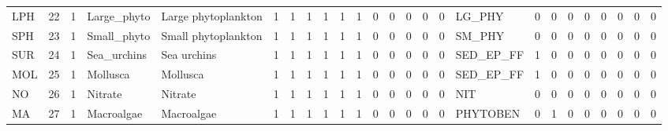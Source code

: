\documentclass[11pt]{article}
\begin{document}
\begin{table}[htb]
\begin{center}
\begin{tabular}{lrrllrrrrrrrrrrrlrrrrrrrr}
 LPH   &     22  &           1  &  Large_phyto           &  Large phytoplankton   &           1  &             1  &          1  &          1  &                1  &          1  &                0  &                  0  &         0  &           0  &      0  &  LG_PHY        &           0  &        0  &             0  &           0  &              0  &             0  &           0  &            0  \\
 SPH   &     23  &           1  &  Small_phyto           &  Small phytoplankton   &           1  &             1  &          1  &          1  &                1  &          1  &                0  &                  0  &         0  &           0  &      0  &  SM_PHY        &           0  &        0  &             0  &           0  &              0  &             0  &           0  &            0  \\
 SUR   &     24  &           1  &  Sea_urchins           &  Sea urchins           &           1  &             1  &          1  &          1  &                1  &          1  &                0  &                  0  &         0  &           0  &      0  &  SED_EP_FF     &           1  &        0  &             0  &           0  &              0  &             0  &           0  &            0  \\
 MOL   &     25  &           1  &  Mollusca              &  Mollusca              &           1  &             1  &          1  &          1  &                1  &          1  &                0  &                  0  &         0  &           0  &      0  &  SED_EP_FF     &           1  &        0  &             0  &           0  &              0  &             0  &           0  &            0  \\
 NO    &     26  &           1  &  Nitrate               &  Nitrate               &           1  &             1  &          1  &          1  &                1  &          1  &                0  &                  0  &         0  &           0  &      0  &  NIT           &           0  &        0  &             0  &           0  &              0  &             0  &           0  &            0  \\
 MA    &     27  &           1  &  Macroalgae            &  Macroalgae            &           1  &             1  &          1  &          1  &                1  &          1  &                0  &                  0  &         0  &           0  &      0  &  PHYTOBEN      &           0  &        1  &             0  &           0  &              0  &             0  &           0  &            0  \\

\end{tabular}
\end{center}
\end{table}
\end{document}
